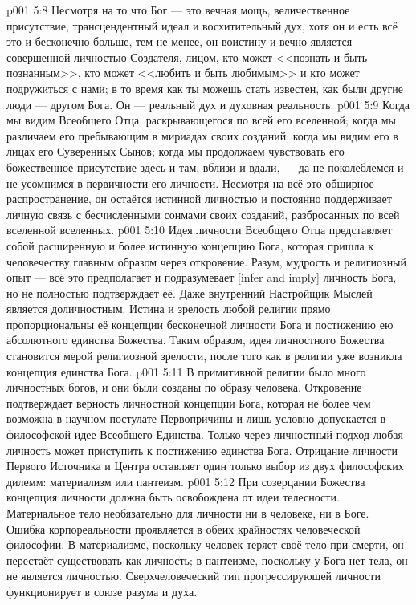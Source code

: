 \vs p001 5:8 \pc Несмотря на то что Бог --- это вечная мощь, величественное присутствие, трансцендентный идеал и восхитительный дух, хотя он и есть всё это и бесконечно больше, тем не менее, он воистину и вечно является совершенной личностью Создателя, лицом, кто может <<познать и быть познанным>>, кто может <<любить и быть любимым>> и кто может подружиться с нами; в то время как ты можешь стать известен, как были другие люди --- другом Бога. Он --- реальный дух и духовная реальность.
\vs p001 5:9 Когда мы видим Всеобщего Отца, раскрывающегося по всей его вселенной; когда мы различаем его пребывающим в мириадах своих созданий; когда мы видим его в лицах его Суверенных Сынов; когда мы продолжаем чувствовать его божественное присутствие здесь и там, вблизи и вдали, --- да не поколеблемся и не усомнимся в первичности его личности. Несмотря на всё это обширное распространение, он остаётся истинной личностью и постоянно поддерживает личную связь с бесчисленными сонмами своих созданий, разбросанных по всей вселенной вселенных.
\vs p001 5:10 \pc Идея личности Всеобщего Отца представляет собой расширенную и более истинную концепцию Бога, которая пришла к человечеству главным образом через откровение. Разум, мудрость и религиозный опыт --- всё это предполагает и подразумевает [infer and imply] личность Бога, но не полностью подтверждает её. Даже внутренний Настройщик Мыслей является доличностным. Истина и зрелость любой религии прямо пропорциональны её концепции бесконечной личности Бога и постижению ею абсолютного единства Божества. Таким образом, идея личностного Божества становится мерой религиозной зрелости, после того как в религии уже возникла концепция единства Бога.
\vs p001 5:11 В примитивной религии было много личностных богов, и они были созданы по образу человека. Откровение подтверждает верность личностной концепции Бога, которая не более чем возможна в научном постулате Первопричины и лишь условно допускается в философской идее Всеобщего Единства. Только через личностный подход любая личность может приступить к постижению единства Бога. Отрицание личности Первого Источника и Центра оставляет один только выбор из двух философских дилемм: материализм или пантеизм.
\vs p001 5:12 При созерцании Божества концепция личности должна быть освобождена от идеи телесности. Материальное тело необязательно для личности ни в человеке, ни в Боге. Ошибка корпореальности проявляется в обеих крайностях человеческой философии. В материализме, поскольку человек теряет своё тело при смерти, он перестаёт существовать как личность; в пантеизме, поскольку у Бога нет тела, он не является личностью. Сверхчеловеческий тип прогрессирующей личности функционирует в союзе разума и духа.
